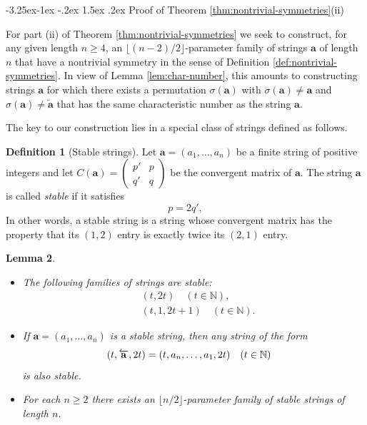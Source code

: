 \documentclass[10pt]{article}
\makeatletter
\renewcommand\subsection{\@startsection{subsection}{2}{\z@}
{-3.25ex\@plus -1ex \@minus -.2ex}
{1.5ex \@plus .2ex}
{\normalfont\normalsize\bfseries\boldmath}}
\newtheorem{lemma}{Lemma}
\theoremstyle{definition}
\newtheorem{definition}[lemma]{Definition}
\numberwithin{equation}{section}
\numberwithin{lemma}{section}
\newcommand{\NN}{\mathbb{N}}
\newcommand{\bfa}{\mathbf{a}}
\newcommand{\bfar}{\overleftarrow{\bfa}}
\makeatother
\begin{document}

\subsection{Proof of Theorem \ref{thm:nontrivial-symmetries}(ii)}

For part (ii) of Theorem \ref{thm:nontrivial-symmetries} we seek to
construct, for any given length $n\ge4$, an 
$\lfloor (n-2)/2\rfloor$-parameter family of strings
$\bfa$ of length $n$ that have a nontrivial symmetry in the sense of
Definition \ref{def:nontrivial-symmetries}.  In view of Lemma
\ref{lem:char-number}, this amounts to constructing strings $\bfa$
for which there exists a permutation $\sigma(\bfa)$ with $\sigma(\bfa)\not=\bfa$
and $\sigma(\bfa)\not=\bfar$ that has the same characteristic number as
the string $\bfa$.

The key to our construction lies in a special class of strings defined as follows.

\begin{definition}[Stable strings]
\label{def:stable-string}
Let $\bfa=(a_1,\dots,a_n)$ be a finite string of positive integers and
let 
$C(\bfa)=\left(\begin{smallmatrix} p'&p\\q'&q\end{smallmatrix}\right)$
be the convergent matrix of $\bfa$.
The string $\bfa$ is called \emph{stable} if it satisfies 
\begin{equation}
\label{eq:def-stable}
p=2q',
\end{equation}
In other words, a stable string is a string whose convergent matrix has the
property that its $(1,2)$ entry is exactly twice its $(2,1)$ entry.
\end{definition}




\begin{lemma}
\label{lem:stable-families}
\mbox{}
\begin{itemize}
\item[(i)] The following families of strings are stable:
\begin{align}
\label{eq:length2-stable-strings}
&(t,2t)
\quad (t\in\NN),
\\
\label{eq:length3-stable-strings}
&(t,1,2t+1)
\quad (t\in\NN).
\end{align}
\item[(ii)]
If $\bfa=(a_1,\dots,a_n)$ is a stable string, then any string of the
form
\begin{align}
\notag
&(t,\bfar, 2t)=(t,a_n,\dots,a_1,2t)
\quad (t\in\NN)
\end{align}
is also stable.
\item[(iii)]
For each $n\ge2$ there exists an $\lfloor n/2\rfloor$-parameter
family of stable strings of length $n$.
\end{itemize}
\end{lemma}
\end{document}
